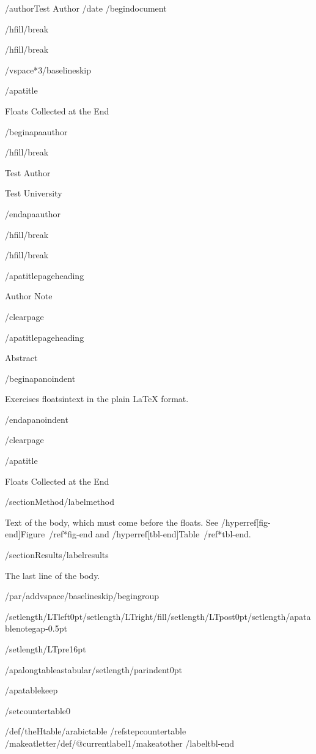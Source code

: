 /author{Test Author}
/date{}
/begin{document}


/hfill/break

/hfill/break

/vspace*{3/baselineskip}

/apatitle{

Floats Collected at the End

}

/begin{apaauthor}

/hfill/break

Test Author

Test University

/end{apaauthor}

/hfill/break

/hfill/break

/apatitlepageheading{

Author Note

}

/clearpage

/apatitlepageheading{

Abstract

}

/begin{apanoindent}

Exercises floatsintext in the plain LaTeX format.

/end{apanoindent}

/clearpage

/apatitle{

Floats Collected at the End

}

/section{Method}/label{method}

Text of the body, which must come before the floats. See
/hyperref[fig-end]{Figure~/ref*{fig-end}} and
/hyperref[tbl-end]{Table~/ref*{tbl-end}}.

/section{Results}/label{results}

The last line of the body.

/par/addvspace{/baselineskip}/begingroup

/setlength{/LTleft}{0pt}/setlength{/LTright}{/fill}/setlength{/LTpost}{0pt}/setlength{/apatablenotegap}{-0.5pt}

/setlength{/LTpre}{16pt}

/apalongtableastabular/setlength{/parindent}{0pt}

/apatablekeep

/setcounter{table}{0}

/def/theHtable{/arabic{table}}%
/refstepcounter{table}%
/makeatletter/def/@currentlabel{1}/makeatother%
/label{tbl-end}

